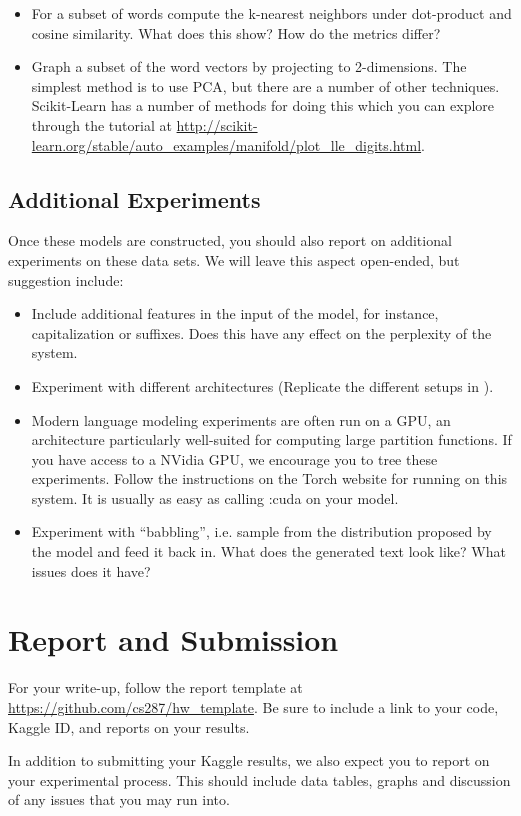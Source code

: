 \documentclass[11pt]{article}
\begin{document}
\begin{itemize}
\item For a subset of words compute the k-nearest neighbors under dot-product and
  cosine similarity. What does this show? How do the metrics differ?
\item Graph a subset of the word vectors by projecting to 2-dimensions.  The simplest method is to use PCA, but there are a number of other techniques. Scikit-Learn has a number of 
  methods for doing this which you can explore through the tutorial at \url{http://scikit-learn.org/stable/auto_examples/manifold/plot_lle_digits.html}.
\end{itemize}

\subsection{Additional Experiments}

Once these models are constructed, you should also report on
additional experiments on these data sets. We will leave this aspect
open-ended, but suggestion include:

\begin{itemize}
\item Include additional features in the input of the model, for instance, capitalization or suffixes. Does this have any effect on the perplexity of the system. 
\item Experiment with different architectures (Replicate the different setups in \cite{}).
\item Modern language modeling experiments are often run on a GPU, an
  architecture particularly well-suited for computing large partition
  functions. If you have access to a NVidia GPU, we encourage you to
  tree these experiments. Follow the instructions on the Torch website for running on this 
  system. It is usually as easy as calling :cuda on your model.
\item Experiment with ``babbling'', i.e. sample from the distribution proposed by the model and 
feed it back in. What does the generated text look like? What issues does it have? 
\end{itemize}

\section{Report and Submission}

For your write-up, follow the report template at
\url{https://github.com/cs287/hw_template}. Be sure to include a link
to your code, Kaggle ID, and reports on your results.

In addition to submitting your Kaggle results, we also expect you to report on your 
experimental process. This should include data tables, graphs and discussion of any 
issues that you may run into. 

 

\end{document}
